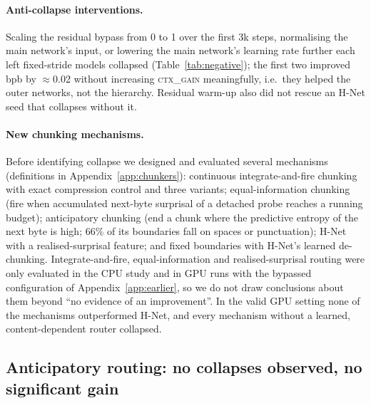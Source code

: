\documentclass[10pt]{article}
\newcommand{\ctx}{\textsc{ctx\_gain}}
\newcommand{\bpb}{bpb}
\begin{document}
\paragraph{Anti-collapse interventions.} Scaling the residual bypass from 0 to 1 over the first
3k steps, normalising the main network's input, or lowering the main network's learning rate
further each left fixed-stride models collapsed (Table~\ref{tab:negative}); the first two
improved \bpb{} by $\approx$0.02 without increasing \ctx{} meaningfully, i.e.\ they helped the
outer networks, not the hierarchy. Residual warm-up also did not rescue an H-Net seed that
collapses without it.

\paragraph{New chunking mechanisms.} Before identifying collapse we designed and evaluated
several mechanisms (definitions in Appendix~\ref{app:chunkers}): continuous integrate-and-fire
chunking \citep{dong2020cif} with exact compression control and three variants;
equal-information chunking (fire when accumulated next-byte surprisal of a detached probe
reaches a running budget); anticipatory chunking (end a chunk where the predictive entropy of the
next byte is high; 66\% of its boundaries fall on spaces or punctuation); H-Net with a realised-surprisal
feature; and fixed boundaries with H-Net's learned de-chunking. Integrate-and-fire,
equal-information and realised-surprisal routing were only evaluated in the CPU study and in GPU
runs with the bypassed configuration of Appendix~\ref{app:earlier}, so we do not draw conclusions
about them beyond ``no evidence of an improvement''. In the valid GPU setting none of the
mechanisms outperformed H-Net, and every mechanism without a learned, content-dependent router
collapsed.

\subsection{Anticipatory routing: no collapses observed, no significant gain}
\label{sec:anticip}
\end{document}

